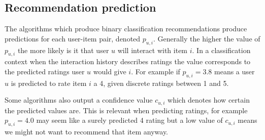 
\subsection{Recommendation prediction}\label{sec:background:theory:pred}

The algorithms which produce binary classification recommendations produce predictions for each user-item pair, denoted $p_{u, i}$. Generally the higher the value of $p_{u, i}$ the more likely is it that user $u$ will interact with item $i$. In a classification context when the interaction history describes ratings the value corresponds to the predicted ratings user $u$ would give $i$. For example if $p_{u, i} = 3.8$ means a user $u$ is predicted to rate item $i$ a 4, given discrete ratings between 1 and 5.

Some algorithms also output a confidence value $c_{u, i}$ which denotes how certain the predicted values are. This is relevant when predicting ratings, for example $p_{u, i} = 4.0$ may seem like a surely predicted 4 rating but a low value of $c_{u, i}$ means we might not want to recommend that item anyway.

